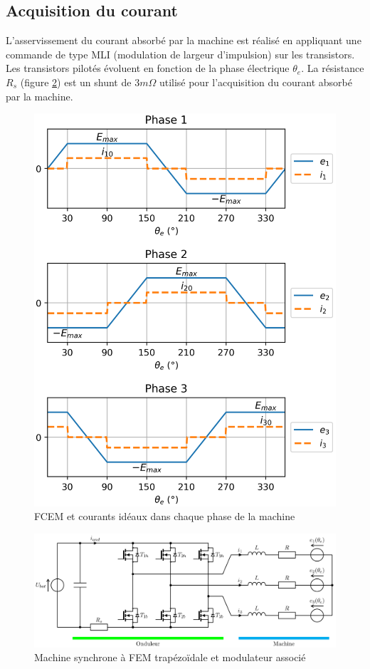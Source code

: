 \subsection{Acquisition du courant}

L'asservissement du courant absorbé par la machine est réalisé en appliquant une commande de type MLI
(modulation de largeur d'impulsion) sur les transistors. Les transistors pilotés évoluent en fonction de la phase électrique $\theta_e$. La résistance $R_s$ (figure \ref{fig13}) est un shunt de $3m\Omega$ utilisé pour l'acquisition du courant absorbé par la machine.

\begin{figure}[ht!]
\begin{center}
\includegraphics[width=.65\linewidth]{img/fig12}
\caption{\label{fig12}FCEM et courants idéaux dans chaque phase de la machine}
\end{center}
\end{figure}

\newpage

\begin{figure}[ht!]
\begin{center}
\includegraphics[width=.95\linewidth]{img/fig13}
\caption{\label{fig13}Machine synchrone à FEM trapézoïdale et modulateur associé}
\end{center}
\end{figure}

